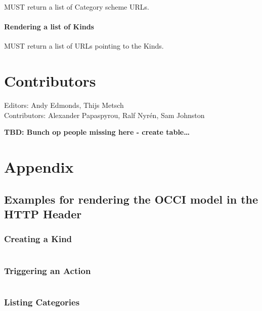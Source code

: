 \documentclass[10pt,a4paper]{article}
\begin{document}
MUST return a list of Category scheme URLs.

\paragraph{Rendering a list of Kinds}

MUST return a list of URLs pointing to the Kinds.

\section{Contributors}

Editors: Andy Edmonds, Thijs Metsch \\
Contributors: Alexander Papaspyrou, Ralf Nyrén, Sam Johnston

\textbf{TBD: Bunch op people missing here - create table\ldots}

\section{Appendix}

\subsection{Examples for rendering the OCCI model in the HTTP Header}

\subsubsection{Creating a Kind}
\begin{verbatim}

\end{verbatim}

\subsubsection{Triggering an Action}

\begin{verbatim}

\end{verbatim}

\subsubsection{Listing Categories}

\begin{verbatim}

\end{verbatim}
\end{document}
